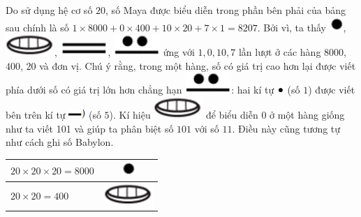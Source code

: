 \begin{multicols}{2}
	Do sử dụng hệ cơ số $20$,  số Maya được biểu diễn trong phần bên phải của bảng  sau chính là số  $1\times 8000+ 0\times 400+ 10\times20+ 7\times1= 8207$. Bởi vì, ta  thấy  \includegraphics[scale=0.3]{33},  \includegraphics[scale=0.3]{34},  \includegraphics[scale=0.3]{35}, \includegraphics[scale=0.3]{36}  ứng với $1, 0, 10, 7$  lần lượt ở các hàng $8000$, $400$, $20$ và đơn vị. Chú ý rằng, trong một hàng, số có giá trị cao hơn lại được viết phía dưới số có giá trị lớn hơn chẳng hạn  \includegraphics[scale=0.3]{36}:  hai kí tự \includegraphics[scale=0.7]{37} (số $1$) được viết bên trên kí tự \includegraphics[scale=0.7]{38} (số $5$). Kí hiệu \includegraphics[scale=0.3]{34} để biểu diễn $0$ ở một hàng giống như ta viết 101 và giúp ta phân biệt số $101$ với số $11$. Điều này cũng tương tự như cách ghi số Babylon. 
	\begin{table}[H]
		\vspace*{-5pt}
		\centering
		\setlength{\tabcolsep}{21pt}
		\renewcommand{\arraystretch}{1.25}
		\begin{tabular}{|l|c|}
			\hline
			$20\times 20\times 20 =8000$  & \includegraphics[scale=0.3]{33} \\
			\hline
			$20\times 20 =400$     & \includegraphics[scale=0.3]{34} \\

\end{tabular}
\end{table}
\end{multicols}
